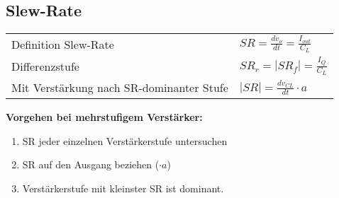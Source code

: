\subsection{Slew-Rate}
\begin{multicols}{2}
\begin{tabularx}{0.95\linewidth}{Xl}
	Definition Slew-Rate & $SR = \frac{d v_o}{dt} = \frac{I_{out}}{C_L}$ \\
	Differenzstufe & $SR_r = |SR_f| = \frac{I_Q}{C_L}$ \\
	Mit Verstärkung nach SR-dominanter Stufe & $|SR| = \frac{d v_{CL}}{dt} \cdot a$ \\
\end{tabularx}

\columnbreak

\textbf{Vorgehen bei mehrstufigem Verstärker:}
\begin{enumerate}
	\item SR jeder einzelnen Verstärkerstufe untersuchen
	\item SR auf den Ausgang beziehen ($\cdot a$)
	\item Verstärkerstufe mit kleinster SR ist dominant.
\end{enumerate}
\end{multicols}